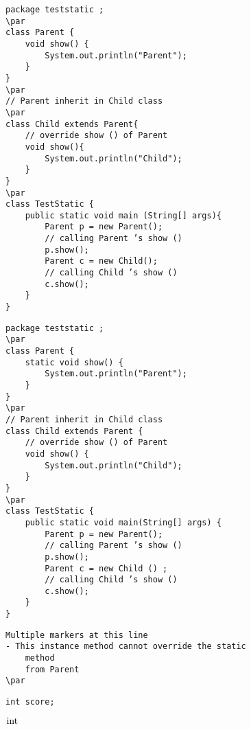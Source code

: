 \documentclass{book}
\def\lthtmlcheckvsize{\ifdim\ht\sizebox<\vsize 
  \ifdim\wd\sizebox<\hsize\expandafter\hfill\fi \expandafter\vfill
  \else\expandafter\vss\fi}%
\begin{document}
{\newpage\clearpage
{}%
\begin{lstlisting}
package teststatic ;
\par
class Parent {
	void show() {
		System.out.println("Parent");
	}
}
\par
// Parent inherit in Child class
\par
class Child extends Parent{
	// override show () of Parent
	void show(){
		System.out.println("Child");
	}
}
\par
class TestStatic {
	public static void main (String[] args){
		Parent p = new Parent();
		// calling Parent ’s show ()
		p.show();
		Parent c = new Child();
		// calling Child ’s show ()
		c.show();
	}
}
\end{lstlisting}%
\lthtmlfigureZ
\lthtmlcheckvsize\clearpage}

{\newpage\clearpage
{}%
\begin{lstlisting}
package teststatic ;
\par
class Parent {
	static void show() {
		System.out.println("Parent");
	}	
}
\par
// Parent inherit in Child class
class Child extends Parent {
	// override show () of Parent
	void show() {
		System.out.println("Child");
	}	
}
\par
class TestStatic {
	public static void main(String[] args) {
		Parent p = new Parent();
		// calling Parent ’s show ()
		p.show();
		Parent c = new Child () ;
		// calling Child ’s show ()
		c.show();
	}
}
\end{lstlisting}%
\lthtmlfigureZ
\lthtmlcheckvsize\clearpage}

{\newpage\clearpage
{}%
\begin{lstlisting}
Multiple markers at this line
- This instance method cannot override the static
	method
	from Parent
\par
\end{lstlisting}%
\lthtmlfigureZ
\lthtmlcheckvsize\clearpage}

{\newpage\clearpage
{}%
\begin{lstlisting}
int score;
\end{lstlisting}%
\lthtmlfigureZ
\lthtmlcheckvsize\clearpage}

{\newpage\clearpage
{}%
$\lstinline{int}$%
\lthtmlindisplaymathZ
\lthtmlcheckvsize\clearpage}
\end{document}

